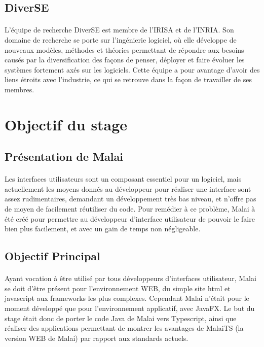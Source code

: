 \documentclass[11pt, a4paper, pdftex]{article}
\begin{document}
    \subsection{DiverSE}\label{subsec:diverse}
             \paragraph{}
                L'équipe de recherche DiverSE est membre de l'IRISA et de l'INRIA. Son domaine de recherche se porte sur l'ingénierie logiciel, où elle développe de nouveaux modèles,
                méthodes et théories permettant de répondre aux besoins causés par la diversification des façons de penser, déployer et faire évoluer les systèmes fortement axés sur les logiciels.
                Cette équipe a pour avantage d'avoir des liens étroits avec l'industrie, ce qui se retrouve dans la façon de travailler de ses membres.
    \newpage
    \section{Objectif du stage}\label{sec:objsta}
    \vspace{1cm}
        \subsection{Présentation de Malai}\label{subsec:premal}
            \paragraph{}
                Les interfaces utilisateurs sont un composant essentiel pour un logiciel, mais actuellement les moyens donnés au développeur pour réaliser
                une interface sont assez rudimentaires, demandant un développement très bas niveau, et n'offre pas de moyen de facilement réutiliser du code.
                Pour remédier à ce problème, Malai à été créé pour permettre au développeur d'interface utilisateur de pouvoir le faire bien plus facilement, et avec un gain de temps non négligeable.
    \vspace{1cm}
        \subsection{Objectif Principal}\label{subsec:objsta}
            \paragraph{}
                Ayant vocation à être utilisé par tous développeurs d'interfaces utilisateur, Malai se doit d'être présent pour l'environnement WEB, du simple site html et javascript aux frameworks les plus complexes.
                Cependant Malai n'était pour le moment développé que pour l'environnement applicatif, avec JavaFX. Le but du stage était donc de porter le code Java de Malai
                vers Typescript, ainsi que réaliser des applications permettant de montrer les avantages de MalaiTS (la version WEB de Malai) par rapport aux standards actuels.
\end{document}
